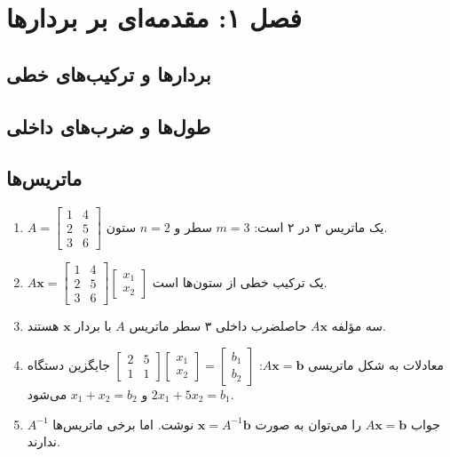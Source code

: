 \documentclass[12pt, a4paper]{book}
\begin{document}
	
	\chapter{فصل ۱: مقدمه‌ای بر بردارها }
	
	\section{بردارها و ترکیب‌های خطی}
	\section{طول‌ها و ضرب‌های داخلی}
	\onehalfspacing
	
	\section{ماتریس‌ها}
	
	\begin{enumerate}
		\item $A = \begin{bmatrix} 1 & 4 \\ 2 & 5 \\ 3 & 6 \end{bmatrix}$ یک ماتریس ۳ در ۲ است: $m=3$ سطر و $n=2$ ستون.
		\item $A\mathbf{x} = \begin{bmatrix} 1 & 4 \\ 2 & 5 \\ 3 & 6 \end{bmatrix} \begin{bmatrix} x_1 \\ x_2 \end{bmatrix}$ یک ترکیب خطی از ستون‌ها است.
		\item سه مؤلفه $A\mathbf{x}$ حاصلضرب داخلی ۳ سطر ماتریس $A$ با بردار $\mathbf{x}$ هستند.
		\item معادلات به شکل ماتریسی $A\mathbf{x}=\mathbf{b}$: $\begin{bmatrix} 2 & 5 \\ 1 & 1 \end{bmatrix} \begin{bmatrix} x_1 \\ x_2 \end{bmatrix} = \begin{bmatrix} b_1 \\ b_2 \end{bmatrix}$ جایگزین دستگاه $2x_1+5x_2=b_1$ و $x_1+x_2=b_2$ می‌شود.
		\item جواب $A\mathbf{x}=\mathbf{b}$ را می‌توان به صورت $\mathbf{x}=A^{-1}\mathbf{b}$ نوشت. اما برخی ماتریس‌ها $A^{-1}$ ندارند.
	\end{enumerate}
	
\end{document}
